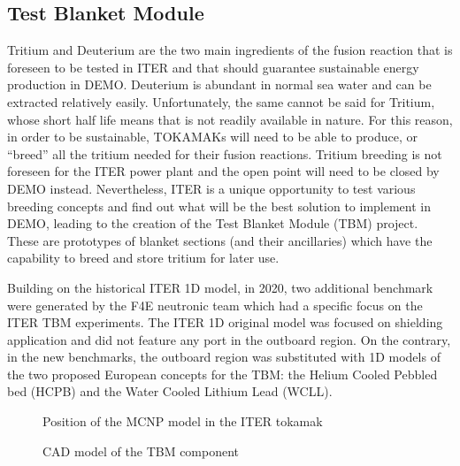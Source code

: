 \documentclass[letterpaper,10pt,english]{sphinxmanual}
\let\sphinxpxdimen\pdfpxdimen\else\newdimen\sphinxpxdimen
\begin{document}
\subsection{Test Blanket Module}
\label{\detokenize{usage/benchmarks:test-blanket-module}}
\sphinxAtStartPar
Tritium and Deuterium are the two main ingredients of the fusion reaction that is
foreseen to be tested in ITER and that should guarantee sustainable energy production
in DEMO. Deuterium is abundant in normal sea water and can be extracted relatively
easily. Unfortunately, the same cannot be said for Tritium, whose short half life
means that is not readily available in nature. For this reason, in order to be
sustainable, TOKAMAKs will need to be able to produce, or “breed” all the tritium
needed for their fusion reactions. Tritium breeding is not foreseen for the ITER
power plant and the open point will need to be closed by DEMO instead. Nevertheless,
ITER is a unique opportunity to test various breeding concepts and find out what
will be the best solution to implement in DEMO, leading to the creation of the
Test Blanket Module (TBM) project. These are prototypes of blanket sections (and
their ancillaries) which have the capability to breed and store tritium for later
use.

\sphinxAtStartPar
Building on the historical ITER 1D model, in 2020,
two additional benchmark were generated by the F4E neutronic
team which had a specific focus on the ITER TBM experiments. The ITER 1D original
model was focused on shielding application and did not feature any port in the
outboard region. On the contrary, in the new benchmarks, the outboard region was
substituted with 1D models of the two proposed European concepts for the TBM: the
Helium Cooled Pebbled bed (HCPB) and the Water Cooled Lithium Lead (WCLL).

\begin{figure}[htbp]
\centering
\capstart

\noindent\sphinxincludegraphics[width=600\sphinxpxdimen]{{ITERCAD}.png}
\caption{Position of the MCNP model in the ITER tokamak}\label{\detokenize{usage/benchmarks:id19}}\end{figure}

\begin{figure}[htbp]
\centering
\capstart

\noindent\sphinxincludegraphics[width=600\sphinxpxdimen]{{tbmCAD}.png}
\caption{CAD model of the TBM component}\label{\detokenize{usage/benchmarks:id20}}\end{figure}
\end{document}
